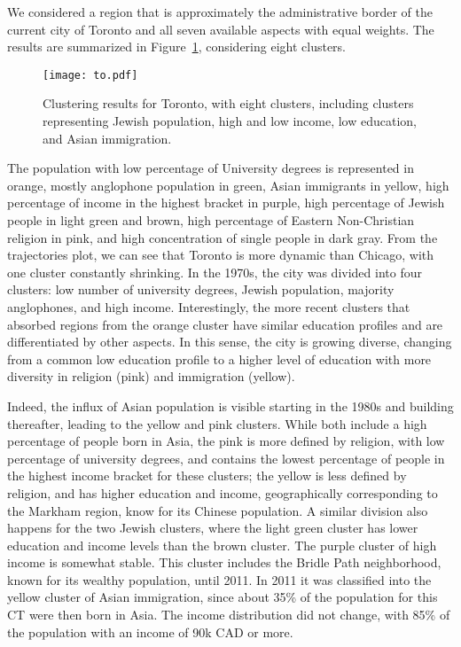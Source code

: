 We considered a region that is approximately the administrative border of the
current city of Toronto and all seven available aspects with equal weights. The
results are summarized in Figure~\ref{fig:to}, considering eight clusters.

\begin{figure}
    \centering 
    \texttt{[image: to.pdf]}
    \caption{Clustering results for Toronto, with eight clusters, including
    clusters representing Jewish population, high and low income, low education,
    and Asian immigration.\label{fig:to}}
\end{figure}

The population with low percentage of University degrees is represented in
orange, mostly anglophone population in green, Asian immigrants in yellow, high
percentage of income in the highest bracket in purple, high percentage of Jewish
people in light green and brown, high percentage of Eastern Non-Christian
religion in pink, and high concentration of single people in dark gray. From the
trajectories plot, we can see that Toronto is more dynamic than Chicago, with
one cluster constantly shrinking. In the 1970s, the city was divided into four
clusters: low number of university degrees, Jewish population, majority
anglophones, and high income. Interestingly, the more recent clusters that
absorbed regions from the orange cluster have similar education profiles and are
differentiated by other aspects. In this sense, the city is growing diverse,
changing from a common low education profile to a higher level of education with
more diversity in religion (pink) and immigration (yellow).


Indeed, the influx of Asian population is visible starting in the 1980s and
building thereafter, leading to the yellow and pink clusters. While both include
a high percentage of people born in Asia, the pink is more defined by religion,
with low percentage of university degrees, and contains the lowest percentage of
people in the highest income bracket for these clusters; the yellow is less
defined by religion, and has higher education and income, geographically
corresponding to the Markham region, know for its Chinese population. A similar
division also happens for the two Jewish clusters, where the light green cluster
has lower education and income levels than the brown cluster. The purple cluster
of high income is somewhat stable. This cluster includes the Bridle Path
neighborhood, known for its wealthy population, until 2011. In 2011 it was
classified into the yellow cluster of Asian immigration, since about 35\% of the
population for this CT were then born in Asia. The income distribution did not
change, with 85\% of the population with an income of 90k CAD or more.


